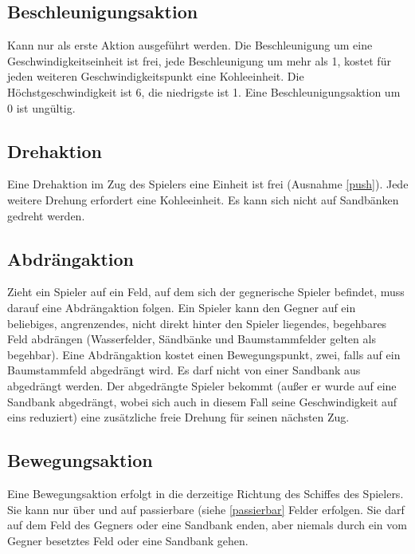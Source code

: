 \documentclass[12pt,a4paper, ngerman, oneside]{scrartcl}
\begin{document}
\subsection{\label{acceleration}Beschleunigungsaktion}
Kann nur als erste Aktion ausgeführt werden. Die Beschleunigung um eine Geschwindigkeitseinheit ist frei, jede Beschleunigung um mehr als 1, kostet für jeden weiteren Geschwindigkeitspunkt eine Kohleeinheit. Die Höchstgeschwindigkeit ist 6, die niedrigste ist 1. Eine Beschleunigungsaktion um 0 ist ungültig.
\subsection{\label{turn}Drehaktion}
Eine Drehaktion im Zug des Spielers eine Einheit ist frei (Ausnahme \ref{push}). Jede weitere Drehung erfordert eine Kohleeinheit. Es kann sich nicht auf Sandbänken gedreht werden. 
\subsection{\label{push}Abdrängaktion}
Zieht ein Spieler auf ein Feld, auf dem sich der gegnerische Spieler befindet, muss darauf eine Abdrängaktion folgen. Ein Spieler kann den Gegner auf ein beliebiges, angrenzendes, nicht direkt hinter den Spieler liegendes, begehbares Feld abdrängen (\label{passierbar}Wasserfelder, Sändbänke und Baumstammfelder gelten als begehbar). Eine Abdrängaktion kostet einen Bewegungspunkt, zwei, falls auf ein Baumstammfeld abgedrängt wird. Es darf nicht von einer Sandbank aus abgedrängt werden. Der abgedrängte Spieler bekommt (außer er wurde auf eine Sandbank abgedrängt, wobei sich auch in diesem Fall seine Geschwindigkeit auf eins reduziert) eine zusätzliche freie Drehung für seinen nächsten Zug.
\subsection{\label{step}Bewegungsaktion}
Eine Bewegungsaktion erfolgt in die derzeitige Richtung des Schiffes des Spielers. Sie kann nur über und auf passierbare (siehe \ref{passierbar} Felder erfolgen. Sie darf auf dem Feld des Gegners oder eine Sandbank enden, aber niemals durch ein vom Gegner besetztes Feld oder eine Sandbank gehen.  
\end{document}
